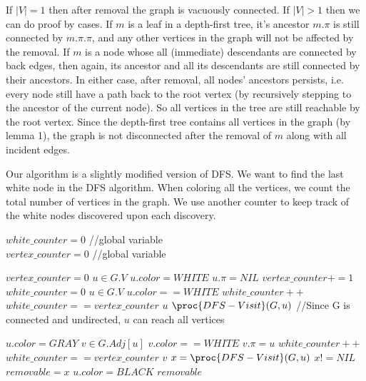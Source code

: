 \documentclass[11pt, answers]{exam}
\theoremstyle{plain}
\theoremstyle{definition}
\begin{document}
\begin{questions}
\begin{solution}
If $|V| = 1$ then after removal the graph is vacuously connected. If $|V| >1$ then we can do proof by cases. If $m$ is a leaf in a depth-first tree, it's ancestor $m.\pi$ is still connected by $m.\pi.\pi$, and any other vertices in the graph will not be affected by the removal. If $m$ is a node whose all (immediate) descendants are connected by back edges, then again, its ancestor and all its descendants are still connected by their ancestors. In either case, after removal, all nodes' ancestors persists, i.e. every node still have a path back to the root vertex (by recursively stepping to the ancestor of the current node). So all vertices in the tree are still reachable by the root vertex. Since the depth-first tree contains all vertices in the graph (by lemma 1), the graph is not disconnected after the removal of $m$ along with all incident edges.

Our algorithm is a slightly modified version of DFS. We want to find the last white node in the DFS algorithm.
When coloring all the vertices, we count the total number of vertices in the graph. We use another counter to keep track of the white nodes discovered upon each discovery. 

\begin{codebox}
 $white\_counter = 0$ //{global variable} \\
 $vertex\_counter = 0$ //{global variable}
\end{codebox}
\begin{codebox}
\li $vertex\_counter = 0$
\li {} $u \in G.V$ \Do
\li     $u.color = WHITE$
\li     $u.\pi = NIL$
\li     $vertex\_counter += 1$ \End
\li $white\_counter = 0$
\li {} $u \in G.V$ \Do
\li     \If $u.color == WHITE$ \Then 
\li         $white\_counter ++$
\li         \If $white\_counter == vertex\_counter$ \Then
\li             \Return $u$\End
\li         \Return $\proc{DFS-Visit}(G,u)$ //{Since G is connected and undirected, $u$ can reach all vertices}
\End\End
\end{codebox}
\begin{codebox}
\li $u.color =GRAY$
\li {} $v \in G.Adj[u]$ \Do
\li     \If $v.color == WHITE$ \Then
\li         $v.\pi = u$
\li         $white\_counter++$
\li         \If $white\_counter == vertex\_counter$ \Then
\li             \Return $v$
\li         \Else 
\li             $x = \proc{DFS-Visit}(G,u)$
\li             \If $x != NIL$ \Then
\li                 $removable = x$ \End\End\End\End
\li $u.color = BLACK$
\li \Return $removable$
\end{codebox}


\end{solution}
\end{questions}
\end{document}
